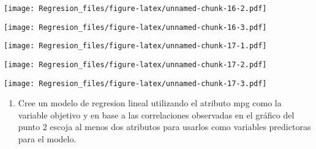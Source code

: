 \documentclass[]{article}
\newenvironment{Shaded}{\begin{snugshade}}{\end{snugshade}}
\newcommand{\KeywordTok}[1]{\textcolor[rgb]{0.13,0.29,0.53}{\textbf{#1}}}
\newcommand{\NormalTok}[1]{#1}
\newcommand{\OperatorTok}[1]{\textcolor[rgb]{0.81,0.36,0.00}{\textbf{#1}}}
\providecommand{\tightlist}{%
  \setlength{\itemsep}{0pt}\setlength{\parskip}{0pt}}
\begin{document}
\texttt{[image: Regresion\_files/figure-latex/unnamed-chunk-16-2.pdf]}

\begin{Shaded}
\end{Shaded}

\texttt{[image: Regresion\_files/figure-latex/unnamed-chunk-16-3.pdf]}

\begin{Shaded}
\end{Shaded}

\texttt{[image: Regresion\_files/figure-latex/unnamed-chunk-17-1.pdf]}

\begin{Shaded}
\end{Shaded}

\texttt{[image: Regresion\_files/figure-latex/unnamed-chunk-17-2.pdf]}

\begin{Shaded}
\end{Shaded}

\texttt{[image: Regresion\_files/figure-latex/unnamed-chunk-17-3.pdf]}

\begin{enumerate}
\def\labelenumi{\arabic{enumi}.}
\setcounter{enumi}{3}
\tightlist
\item
  Cree un modelo de regresion lineal utilizando el atributo mpg como la
  variable objetivo y en base a las correlaciones observadas en el
  gráfico del punto 2 escoja al menos dos atributos para usarlos como
  variables predictoras para el modelo.
\end{enumerate}
\end{document}
